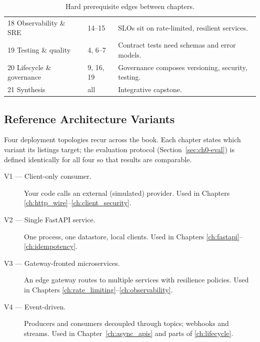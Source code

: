 \begin{table}[h]
\begin{tabularx}{\textwidth}{l l X}
    18 Observability \& SRE & 14--15 & SLOs sit on rate-limited, resilient services. \\
    19 Testing \& quality & 4, 6--7 & Contract tests need schemas and error models. \\
    20 Lifecycle \& governance & 9, 16, 19 & Governance composes versioning, security, testing. \\
    21 Synthesis & all & Integrative capstone. \\
    \bottomrule
  \end{tabularx}
  \caption{Hard prerequisite edges between chapters.}
  \label{tab:ch0-deps}
\end{table}

\subsection{Reference Architecture Variants}
\label{sec:ch0-refarch}

Four deployment topologies recur across the book. Each chapter states which
variant its listings target; the evaluation protocol
(Section~\ref{sec:ch0-eval}) is defined identically for all four so that
results are comparable.

\begin{description}
  \item[V1 --- Client-only consumer.] Your code calls an external (simulated)
    provider. Used in Chapters \ref{ch:http_wire}--\ref{ch:client_security}.
  \item[V2 --- Single FastAPI service.] One process, one datastore, local
    clients. Used in Chapters \ref{ch:fastapi}--\ref{ch:idempotency}.
  \item[V3 --- Gateway-fronted microservices.] An edge gateway routes to
    multiple services with resilience policies. Used in Chapters
    \ref{ch:rate_limiting}--\ref{ch:observability}.
  \item[V4 --- Event-driven.] Producers and consumers decoupled through
    topics; webhooks and streams. Used in Chapter~\ref{ch:async_apis} and
    parts of \ref{ch:lifecycle}.
\end{description}


